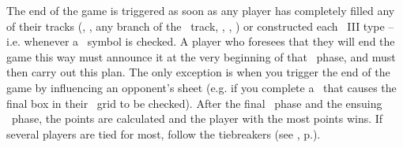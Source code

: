 The end of the game is triggered as soon as any player has completely filled any of their tracks (\population, \currency, any branch of the \tech\ track, \military, \trade, \culture) or constructed each \level\ III \fortification type – i.e. whenever a \masterysymbol\ symbol is checked.
\newline\newline
A player who foresees that they will end the game this way must announce it at the very beginning of that \development\ phase, and must then carry out this plan.  The only exception is when you trigger the end of the game by influencing an opponent’s sheet (e.g. if you complete a \convoy\ that causes the final box in their \culture\ grid to be checked).
\newline\newline
After the final \development\ phase and the ensuing \deployment\ phase, the points are calculated and the player with the most points wins. If several players are tied for most, follow the tiebreakers (see , p.\pageref{sec:scoring}).

